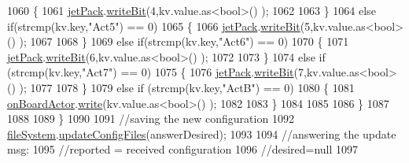 \begin{DoxyCode}
1060                     \{
1061                         \hyperlink{class_cool_board_a30b1357881b01ccbec676856a91e48e9}{jetPack}.\hyperlink{class_jetpack_a79ae7bc3c1828a0551a7c005c4f8bd00}{writeBit}(4,kv.value.as<\textcolor{keywordtype}{bool}>() ); 
1062 
1063                     \}
1064                     \textcolor{keywordflow}{else} \textcolor{keywordflow}{if}(strcmp(kv.key,\textcolor{stringliteral}{"Act5"}) == 0)
1065                     \{
1066                         \hyperlink{class_cool_board_a30b1357881b01ccbec676856a91e48e9}{jetPack}.\hyperlink{class_jetpack_a79ae7bc3c1828a0551a7c005c4f8bd00}{writeBit}(5,kv.value.as<\textcolor{keywordtype}{bool}>() ); 
1067 
1068                     \}
1069                     \textcolor{keywordflow}{else} \textcolor{keywordflow}{if}(strcmp(kv.key,\textcolor{stringliteral}{"Act6"}) == 0)
1070                     \{
1071                         \hyperlink{class_cool_board_a30b1357881b01ccbec676856a91e48e9}{jetPack}.\hyperlink{class_jetpack_a79ae7bc3c1828a0551a7c005c4f8bd00}{writeBit}(6,kv.value.as<\textcolor{keywordtype}{bool}>() ); 
1072 
1073                     \}
1074                     \textcolor{keywordflow}{else} \textcolor{keywordflow}{if} (strcmp(kv.key,\textcolor{stringliteral}{"Act7"}) == 0)
1075                     \{
1076                         \hyperlink{class_cool_board_a30b1357881b01ccbec676856a91e48e9}{jetPack}.\hyperlink{class_jetpack_a79ae7bc3c1828a0551a7c005c4f8bd00}{writeBit}(7,kv.value.as<\textcolor{keywordtype}{bool}>() ); 
1077 
1078                     \}
1079                     \textcolor{keywordflow}{else} \textcolor{keywordflow}{if} (strcmp(kv.key,\textcolor{stringliteral}{"ActB"}) == 0)
1080                     \{
1081                         \hyperlink{class_cool_board_a4ac693895c21025b8808653f2a4316e6}{onBoardActor}.\hyperlink{class_cool_board_actor_a958786ff01ea1056ee72c72d439f86da}{write}(kv.value.as<\textcolor{keywordtype}{bool}>() ); 
1082 
1083                     \}
1084                                 
1085                 
1086                 \}
1087 
1088                 
1089             \}
1090 
1091             \textcolor{comment}{//saving the new configuration}
1092             \hyperlink{class_cool_board_a42c2586fbb13ff7f06538e9284e8538d}{fileSystem}.\hyperlink{class_cool_file_system_adfa8e2e80641ae6f0cceabd348a9b841}{updateConfigFiles}(answerDesired);
1093 
1094                 \textcolor{comment}{//answering the update msg:}
1095             \textcolor{comment}{//reported = received configuration}
1096             \textcolor{comment}{//desired=null}
1097         

\end{DoxyCode}
